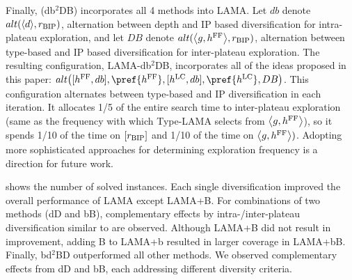 Finally, (db$^2$DB) incorporates all 4 methods into LAMA.
Let $db$ denote $alt({\left<d\right>},r_\text{BIP})$, alternation between depth and IP based diversification for intra-plateau exploration,
and let $DB$ denote $alt({\left<g,\text{$h^\text{FF}$}\right>},r_\text{BIP})$, alternation between type-based and IP based diversification for inter-plateau exploration.
The resulting configuration,
LAMA-db$^2$DB, incorporates all of the ideas proposed in this paper: {\small $alt\big([\ff,db], \pref{\ff}, [\lc,db], \pref{\lc}, DB\big)$.}
This configuration alternates between type-based and IP diversification in each iteration.
It allocates 1/5 of the entire search time to inter-plateau exploration 
(same as the frequency with which Type-LAMA selects from ${\left<g,\text{$h^\text{FF}$}\right>}$),
so it spends 1/10 of the time on $[r_\text{BIP}]$ and 1/10 of the time on ${\left<g,\text{$h^\text{FF}$}\right>})$.
Adopting more sophisticated approaches for determining exploration frequency \cite{schulte2014balancing,nakhost2009monte} is a direction for future work.




% 


 shows the number of solved instances.
Each single diversification improved the overall performance of LAMA except LAMA+B.
For combinations of two methods (dD and bB),
complementary effects by intra-/inter-plateau diversification similar to  are observed.
Although LAMA+B did not result in improvement, adding B to LAMA+b resulted in larger coverage in LAMA+bB.
Finally, bd$^2$BD outperformed all other methods.
We observed complementary effects from dD and bB, each addressing different diversity criteria.

